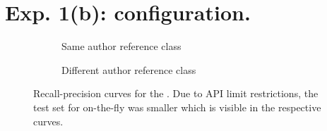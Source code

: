 \section{Exp. 1(b): \impAppr{} configuration.}

\begin{figure}[H]
  \centering
  \begin{subfigure}{0.75\textwidth}
    \centering
    
    \caption{Same author reference class}
    \label{fig:student_essays_same_author}
  \end{subfigure}
  \hfill
  \begin{subfigure}{0.75\textwidth}
    \centering
    
    \caption{Different author reference class}
    \label{fig:student_essays_different_author}
  \end{subfigure}
  \caption{Recall-precision curves for the \dataStudent{}. 
Due to API limit restrictions, the test set for on-the-fly was smaller which is visible in the respective curves.
  }
  \label{fig:diff_imp_gen_student_essays}
\end{figure}